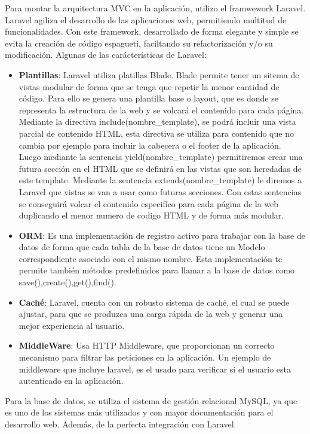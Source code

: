 \vspace{5 mm}

Para montar la arquitectura MVC en la aplicación, utilizo el framwework Laravel. Laravel agiliza el desarrollo de las aplicaciones web, permitiendo multitud de funcionalidades. Con este framework, desarrollado de forma elegante y simple se evita la creación de código espagueti, faciltando su refactorización y/o su modificación. Algunas de las carácterísticas de Laravel: 


\begin{itemize}

\item \textbf{Plantillas}: Laravel utiliza platillas Blade. Blade permite tener un sitema de vistas modular de forma que se tenga que repetir la menor cantidad de código. Para ello se genera una plantilla base o layout, que es donde se representa la estructura de la web y se volcará el contenido para cada página. Mediante la directiva include(nombre\_template), se podrá incluir una vista parcial de contenido HTML, esta directiva se utiliza para contenido que no cambia por ejemplo para incluir la cabecera o el footer de la aplicación. Luego mediante la sentencia yield(nombre\_template) permitiremos crear una futura sección en el HTML que se definirá en las vistas que son heredadas de este template. Mediante la sentencia extends(nombre\_template) le diremos a Laravel que vistas se van a usar como futuras secciones. Con estas sentencias se conseguirá volcar el contenido especifíco para cada página de la web duplicando el menor numero de codigo HTML y de forma más modular.

\item \textbf{ORM}: Es una implementación de registro activo para trabajar con la base de datos de forma que cada tabla de la base de datos tiene un Modelo correspondiente asociado con el mismo nombre. Esta implementación te permite también métodos predefinidos para llamar a la base de datos como save(),create(),get(),find().

\item \textbf{Caché}: Laravel, cuenta con un robusto sistema de caché, el cual se puede ajustar, para que se produzca una carga rápida de la web y generar una mejor experiencia al usuario.

\item \textbf{MiddleWare}: Usa HTTP Middleware, que proporcionan un correcto mecanismo para filtrar las peticiones en la aplicación. Un ejemplo de middleware que incluye laravel, es el usado para verificar si el usuario esta autenticado en la aplicación.

\end{itemize}

\vspace{5 mm}

Para la base de datos, se utiliza el sistema de gestión relacional MySQL, ya que es uno de los sistemas más utilizados y con mayor documentación para el desarrollo web. Además, de la perfecta integración con Laravel.